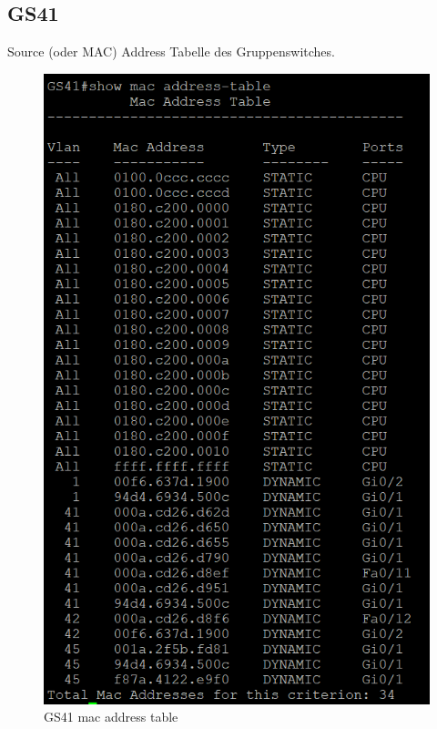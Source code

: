 \documentclass{article}
\begin{document}
\subsection{GS41}
Source (oder MAC) Address Tabelle des Gruppenswitches.\\
\begin{figure}[!htp]
  \centering
  \begin{minipage}[b]{0.45\textwidth}
    \includegraphics[width=\textwidth]{Arbeitsergebnisse/GS41/gs41_mac_address-table.png}
    \caption{GS41 mac address table}
  \end{minipage}
\end{figure}
\end{document}

